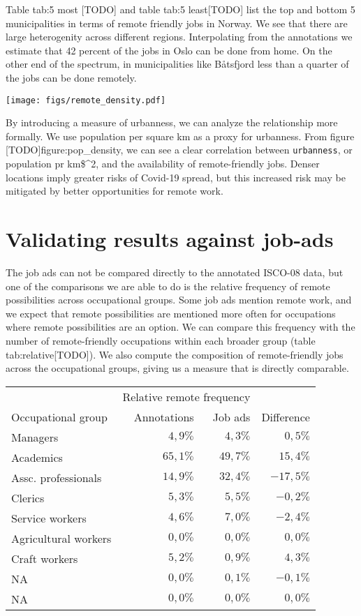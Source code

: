 \documentclass[11pt,]{article}
\begin{document}
Table tab:5 most {[}TODO{]} and table tab:5 least{[}TODO{]} list the top
and bottom 5 municipalities in terms of remote friendly jobs in Norway.
We see that there are large heterogenity across different regions.
Interpolating from the annotations we estimate that 42 percent of the
jobs in Oslo can be done from home. On the other end of the spectrum, in
municipalities like Båtsfjord less than a quarter of the jobs can be
done remotely.

\texttt{[image: figs/remote\_density.pdf]}

By introducing a measure of urbanness, we can analyze the relationship
more formally. We use population per square km as a proxy for urbanness.
From figure {[}TODO{]}figure:pop\_density, we can see a clear
correlation between \texttt{urbanness}, or population pr km\$\^{}2, and
the availability of remote-friendly jobs. Denser locations imply greater
risks of Covid-19 spread, but this increased risk may be mitigated by
better opportunities for remote work.

\hypertarget{validating-results-against-job-ads}{%
\section{Validating results against
job-ads}\label{validating-results-against-job-ads}}

The job ads can not be compared directly to the annotated ISCO-08 data,
but one of the comparisons we are able to do is the relative frequency
of remote possibilities across occupational groups. Some job ads mention
remote work, and we expect that remote possibilities are mentioned more
often for occupations where remote possibilities are an option. We can
compare this frequency with the number of remote-friendly occupations
within each broader group (table tab:relative{[}TODO{]}). We also
compute the composition of remote-friendly jobs across the occupational
groups, giving us a measure that is directly comparable.

\captionsetup[table]{labelformat=empty,skip=1pt}
\begin{longtable}{lrrr}
\toprule
& \multicolumn{2}{c}{Relative remote frequency} & \\ 
 \cmidrule(lr){2-3}
Occupational group & Annotations & Job ads & Difference \\ 
\midrule
Managers & $4,9\%$ & $4,3\%$ & $0,5\%$ \\ 
Academics & $65,1\%$ & $49,7\%$ & $15,4\%$ \\ 
Assc. professionals & $14,9\%$ & $32,4\%$ & $-17,5\%$ \\ 
Clerics & $5,3\%$ & $5,5\%$ & $-0,2\%$ \\ 
Service workers & $4,6\%$ & $7,0\%$ & $-2,4\%$ \\ 
Agricultural workers & $0,0\%$ & $0,0\%$ & $0,0\%$ \\ 
Craft workers & $5,2\%$ & $0,9\%$ & $4,3\%$ \\ 
NA & $0,0\%$ & $0,1\%$ & $-0,1\%$ \\ 
NA & $0,0\%$ & $0,0\%$ & $0,0\%$ \\ 
\bottomrule
\end{longtable}
\end{document}
